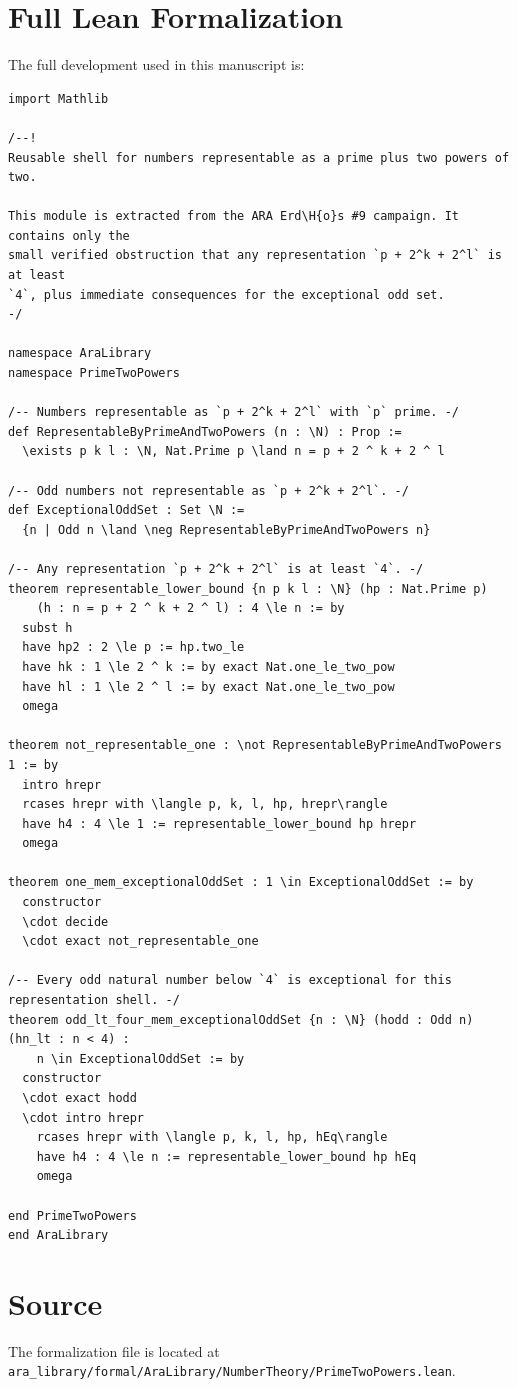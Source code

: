\documentclass[11pt]{article}
\begin{document}
\appendix
\section{Full Lean Formalization}
The full development used in this manuscript is:

\begin{lstlisting}
import Mathlib

/--!
Reusable shell for numbers representable as a prime plus two powers of two.

This module is extracted from the ARA Erd\H{o}s #9 campaign. It contains only the
small verified obstruction that any representation `p + 2^k + 2^l` is at least
`4`, plus immediate consequences for the exceptional odd set.
-/

namespace AraLibrary
namespace PrimeTwoPowers

/-- Numbers representable as `p + 2^k + 2^l` with `p` prime. -/
def RepresentableByPrimeAndTwoPowers (n : \N) : Prop :=
  \exists p k l : \N, Nat.Prime p \land n = p + 2 ^ k + 2 ^ l

/-- Odd numbers not representable as `p + 2^k + 2^l`. -/
def ExceptionalOddSet : Set \N :=
  {n | Odd n \land \neg RepresentableByPrimeAndTwoPowers n}

/-- Any representation `p + 2^k + 2^l` is at least `4`. -/
theorem representable_lower_bound {n p k l : \N} (hp : Nat.Prime p)
    (h : n = p + 2 ^ k + 2 ^ l) : 4 \le n := by
  subst h
  have hp2 : 2 \le p := hp.two_le
  have hk : 1 \le 2 ^ k := by exact Nat.one_le_two_pow
  have hl : 1 \le 2 ^ l := by exact Nat.one_le_two_pow
  omega

theorem not_representable_one : \not RepresentableByPrimeAndTwoPowers 1 := by
  intro hrepr
  rcases hrepr with \langle p, k, l, hp, hrepr\rangle
  have h4 : 4 \le 1 := representable_lower_bound hp hrepr
  omega

theorem one_mem_exceptionalOddSet : 1 \in ExceptionalOddSet := by
  constructor
  \cdot decide
  \cdot exact not_representable_one

/-- Every odd natural number below `4` is exceptional for this representation shell. -/
theorem odd_lt_four_mem_exceptionalOddSet {n : \N} (hodd : Odd n) (hn_lt : n < 4) :
    n \in ExceptionalOddSet := by
  constructor
  \cdot exact hodd
  \cdot intro hrepr
    rcases hrepr with \langle p, k, l, hp, hEq\rangle
    have h4 : 4 \le n := representable_lower_bound hp hEq
    omega

end PrimeTwoPowers
end AraLibrary
\end{lstlisting}

\section{Source}
The formalization file is located at
\texttt{ara_library/formal/AraLibrary/NumberTheory/PrimeTwoPowers.lean}.
\end{document}
